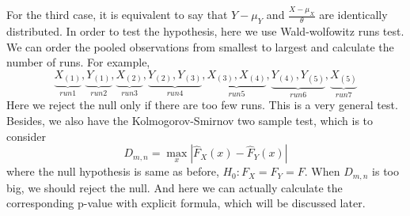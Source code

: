 \documentclass[twoside]{article}
\begin{document}
For the third case, it is equivalent to say that $Y - \mu_Y$ and $\frac{X - \mu_X}{\theta}$ are identically distributed. In order to test the hypothesis, here we use Wald-wolfowitz runs test. We can order the pooled observations from smallest to largest and calculate the number of runs. For example, 
$$
\underbrace{X_{(1)}}_{run1}, \underbrace{Y_{(1)}}_{run2}, \underbrace{X_{(2)}}_{run3}, \underbrace{Y_{(2)}, Y_{(3)}}_{run4}, 
\underbrace{X_{(3)}, X_{(4)}}_{run5}, \underbrace{Y_{(4)}, Y_{(5)}}_{run6}, \underbrace{X_{(5)}}_{run7}
$$
Here we reject the null only if there are too few runs. This is a very general test. Besides, we also have the Kolmogorov-Smirnov two sample test, which is to consider 
$$
D_{m,n} = \max_{x} |\hat{F}_X(x) - \hat{F}_Y(x)|
$$
where the null hypothesis is same as before, $H_0: F_X = F_Y = F$. When $D_{m,n}$ is too big, we should reject the null. And here we can actually calculate the corresponding p-value with explicit formula, which will be discussed later. 
	
\end{document}
